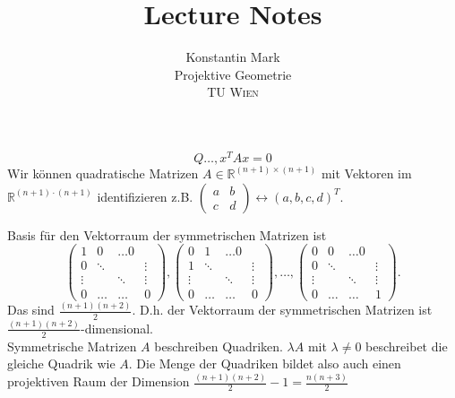 \documentclass[../main.tex]{subfiles}
\title{Lecture Notes}
\author{Konstantin Mark\\
Projektive Geometrie\\ 
\textsc{TU Wien}
}
\begin{document}
\maketitle
\begin{remark}
\begin{equation}
  Q\dots, x^TAx = 0
\end{equation}
Wir können quadratische Matrizen $A\in \mathbb R^{(n+1)\times(n+1)}$ mit Vektoren im $\mathbb R^{(n+1)\cdot(n+1)}$ identifizieren z.B. $\left(\begin{array}{cc}
     a&b  \\
     c& d
\end{array}\right)\leftrightarrow (a,b,c,d)^T$. 

Basis für den Vektorraum der symmetrischen Matrizen ist \begin{equation*}
    \left(\begin{array}{cccc}
         1&0&\dots 0  \\
         0&\ddots&&\vdots\\
         \vdots&&\ddots&\vdots\\
         0&\dots&\dots&0
    \end{array}\right),
    \left(\begin{array}{cccc}
        0&1&\dots 0  \\
         1&\ddots&&\vdots\\
         \vdots&&\ddots&\vdots\\
         0&\dots&\dots&0
    \end{array}\right),
    \dots,
    \left(\begin{array}{cccc}
        0&0&\dots 0  \\
         0&\ddots&&\vdots\\
         \vdots&&\ddots&\vdots\\
         0&\dots&\dots&1
    \end{array}\right).
\end{equation*}
Das sind $\frac{(n+1)(n+2)}2$. D.h. der Vektorraum der symmetrischen Matrizen ist $\frac{(n+1)(n+2)}2$-dimensional.\\
Symmetrische Matrizen $A$ beschreiben Quadriken. $\lambda A$ mit $\lambda \neq 0$ beschreibet die gleiche Quadrik wie $A$. Die Menge der Quadriken bildet also auch einen projektiven Raum der Dimension $\frac{(n+1)(n+2)}2-1 = \frac{n(n+3)}2$
\end{remark}
\end{document}
